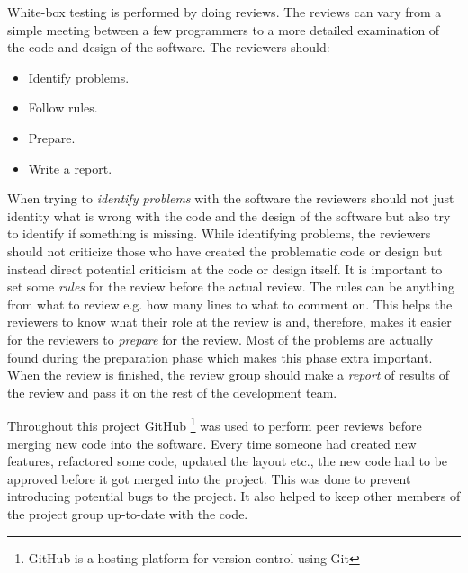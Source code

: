 White-box testing is performed by doing reviews.
The reviews can vary from a simple meeting between a few programmers to a more detailed examination of the code and design of the software.
The reviewers should: \cite{SoftwareTesting}

\begin{itemize}
	\item Identify problems.
	\item Follow rules.
	\item Prepare.
	\item Write a report.
\end{itemize}

When trying to \textit{identify problems} with the software the reviewers should not just identity what is wrong with the code and the design of the software but also try to identify if something is missing.
While identifying problems, the reviewers should not criticize those who have created the problematic code or design but instead direct potential criticism at the code or design itself.
It is important to set some \textit{rules} for the review before the actual review.
The rules can be anything from what to review e.g. how many lines to what to comment on.
This helps the reviewers to know what their role at the review is and, therefore, makes it easier for the reviewers to \textit{prepare} for the review.
Most of the problems are actually found during the preparation phase which makes this phase extra important.
When the review is finished, the review group should make a \textit{report} of results of the review and pass it on the rest of the development team. \cite{SoftwareTesting}

Throughout this project GitHub \footnote{GitHub is a hosting platform for version control using Git} was used to perform peer reviews before merging new code into the software. 
Every time someone 
had created new features, refactored some code, updated the layout etc., the new code had to be approved 
before it got merged into the project.
This was done to prevent introducing potential bugs to the project.
It also helped to keep other members of the project group up-to-date with the code.


